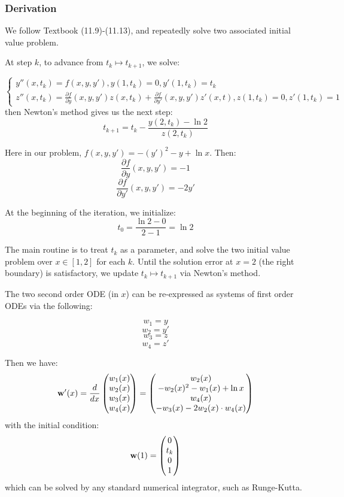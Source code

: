 \documentclass[12pt]{article} %
\newcommand{\1}[1]{\mathds{1}\left[#1\right]}
\begin{document}
\subsubsection{Derivation}
We follow Textbook (11.9)-(11.13), and repeatedly solve two associated initial value problem.

At step $k$, to advance from $t_k\mapsto t_{k+1}$, we solve:

$$
\begin{cases}
	y''(x,t_k) = f(x, y, y'), y(1,t_k) = 0, y'(1,t_k) = t_k\\
	z''(x,t_k) = \frac{\partial f}{\partial y}(x,y,y')z(x,t_k) + \frac{\partial f}{\partial y'}(x,y,y')z'(x,t), z(1, t_k) = 0, z'(1, t_k) = 1
\end{cases}
$$ then Newton's method gives us the next step:
$$
	t_{k+1} = t_k - \frac{y(2, t_k) - \ln 2}{z(2, t_k)}
$$

Here in our problem, $f(x,y,y') = -(y')^2 - y + \ln x$. Then:
$$
	\frac{\partial f}{\partial y}(x,y,y') = -1
$$
$$
	\frac{\partial f}{\partial y'}(x,y,y') = -2y'
$$


At the beginning of the iteration, we initialize:
$$
	t_0 = \frac{\ln 2-0}{2-1} = \ln 2
$$

The main routine is to treat $t_k$ as a parameter, and solve the two initial value problem over $x\in [1,2]$ for each $k$. Until the solution error at $x=2$ (the right boundary) is satisfactory, we update $t_k\mapsto t_{k+1}$ via Newton's method. 

The two second order ODE (in $x$) can be re-expressed as systems of first order ODEs via the following:

$$
	w_1 = y
$$
$$
	w_2 = y'
$$
$$
	w_3 = z
$$
$$
	w_4 = z'
$$

Then we have:
$$
	{\bf{w}}'(x)=\frac{d}{dx}
	\begin{pmatrix}
		w_1(x)\\
		w_2(x)\\
		w_3(x)\\
		w_4(x)
	\end{pmatrix} = 
	\begin{pmatrix}
		w_2(x)\\
		-w_2(x)^2 - w_1(x) + \ln x\\
		w_4(x)\\
		-w_3(x) - 2w_2(x)\cdot w_4(x)
	\end{pmatrix}
$$ with the initial condition:
$$
	{\bf{w}}(1) = 
	\begin{pmatrix}
		0\\
		t_k\\
		0\\
		1
	\end{pmatrix}
$$ which can be solved by any standard numerical integrator, such as Runge-Kutta.
\end{document}
